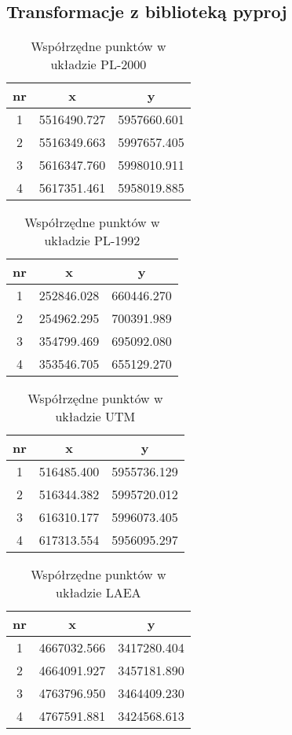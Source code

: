 \documentclass[fleqn,10pt,a4paper]{article}
\begin{document}
\subsection{Transformacje z biblioteką pyproj}

\begin{table}[!ht]
  \centering
  \begin{tabular}{|c|c|c|}
    \hline
    nr & x           & y           \\ \hline
    1  & 5516490.727 & 5957660.601 \\
    2  & 5516349.663 & 5997657.405 \\
    3  & 5616347.760 & 5998010.911 \\
    4  & 5617351.461 & 5958019.885 \\
    \hline
  \end{tabular}
  \caption{Współrzędne punktów w układzie PL-2000}
  \label{tab:2000}
\end{table}

\begin{table}[!ht]
  \centering
  \begin{tabular}{|c|c|c|}
    \hline
    nr & x          & y          \\
    \hline
    1  & 252846.028 & 660446.270 \\
    2  & 254962.295 & 700391.989 \\
    3  & 354799.469 & 695092.080 \\
    4  & 353546.705 & 655129.270 \\
    \hline
  \end{tabular}
  \caption{Współrzędne punktów w układzie PL-1992}
  \label{tab:1992}
\end{table}

\begin{table}[!ht]
  \centering
  \begin{tabular}{|c|c|c|}
    \hline
    nr & x           & y          \\
    \hline
    1  & 516485.400 & 5955736.129 \\
    2  & 516344.382  & 5995720.012 \\
    3  & 616310.177 & 5996073.405\\
    4  & 617313.554 & 5956095.297\\
    \hline
  \end{tabular}
  \caption{Współrzędne punktów w układzie UTM}
  \label{tab:utm}
\end{table}

\begin{table}[!ht]
  \centering
  \begin{tabular}{|c|c|c|}
    \hline
    nr & x           & y           \\
    \hline
    1  & 4667032.566 & 3417280.404 \\
    2  & 4664091.927 & 3457181.890 \\
    3  & 4763796.950 & 3464409.230 \\
    4  & 4767591.881 & 3424568.613 \\
    \hline
  \end{tabular}
  \caption{Współrzędne punktów w układzie LAEA}
  \label{tab:laea}
\end{table}
\end{document}
